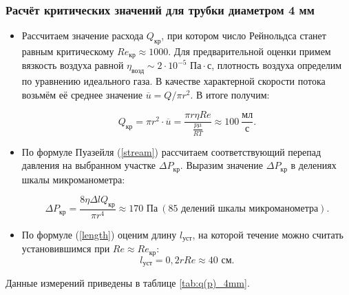 \documentclass[a4paper, 12pt]{article}
\begin{document}
    \subsubsection*{Расчёт критических значений для трубки диаметром 4 мм}

    \begin{itemize}
        \item Рассчитаем значение расхода $Q_{\text{кр}}$, при котором число Рейнольдса
        станет равным критическому $Re_{\text{кр}} \approx 1000$. Для предварительной
        оценки примем вязкость воздуха равной $\eta_{\text{возд}} \sim 2 \cdot 10^{-5} \text{ Па}\cdot \text{с}$, плотность воздуха определим по уравнению идеального газа. В качестве характерной скорости потока возьмём её среднее значение $\overline{u} = Q/\pi r^2$. В итоге получим:

        \begin{equation}
            \label{Q_crit}
            Q_{\text{кр}} = \pi r^2 \cdot \overline{u} = \frac{\pi r \eta Re}{\frac{p \mu}{RT}} \approx 100 \: \frac{\text{мл}}{\text{с}}.
        \end{equation}
        
        \item  По формуле Пуазейля (\ref{stream}) рассчитаем соответствующий перепад давления на выбранном участке $\Delta P_{\text{кр}}$. Выразим значение $\Delta P_{\text{кр}}$ в делениях шкалы микроманометра:

        \begin{equation}
            \label{P_crit}
            \Delta P_{\text{кр}} = \frac{8 \eta \Delta l Q_\text{кр}}{\pi r^4} \approx 170 \text{ Па} \: (85 \text{ делений шкалы микроманометра}).
        \end{equation}

        \item По формуле (\ref{length}) оценим длину $l_\text{уст}$, на которой течение можно считать установившимся при $Re \approx Re_\text{кр}$: \[ l_{\text{уст}} = 0,2 r Re \approx 40 \text{ см}. \]
 
    \end{itemize}
    
    \noindent Данные измерений приведены в таблице \ref{tab:q(p)_4mm}.
\end{document}
